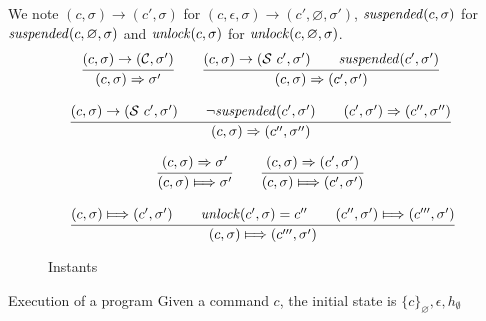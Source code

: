 \documentclass[12pt]{article}
\def\heap{\sigma}
\def\continue{{\mathcal{C}}}
\def\suspend{{\mathcal{S}}}
\begin{document}
We note $(c,\heap) \rightarrow (c', \heap)$ for $(c,\epsilon,\heap) \rightarrow (c',\varnothing,\heap')$,
$\suspended(c,\heap)$ for $\suspended(c,\varnothing,\heap)$ and
$\unlock(c,\heap)$ for $\unlock(c,\varnothing,\heap)$.
$$
\begin{array}{c}
  \cfrac{
   (c,\heap) \rightarrow (\continue,\heap') 
  }{
    (c,\heap) \Rightarrow \heap'
  }
  \qquad
  \cfrac{
    (c,\heap) \rightarrow (\suspend~c',\heap') \qquad 
    \suspended (c',\heap')
   }{
     (c,\heap) \Rightarrow (c', \heap')
   }
  \\\\
  \cfrac{
   (c,\heap) \rightarrow (\suspend~c',\heap') \qquad 
   \neg \suspended (c',\heap') \qquad (c',\heap') \Rightarrow (c'',\heap'')
  }{
    (c,\heap) \Rightarrow (c'', \heap'')
  }
\end{array}
$$
\begin{figure}
$$
\begin{array}{c}
  \cfrac{
    (c,\heap) \Rightarrow \heap'
  }{
    (c,\heap) \Longmapsto \heap'
  }
  \qquad 
  \cfrac{
    (c,\heap) \Rightarrow (c',\heap')
  }{
    (c,\heap) \Longmapsto (c', \heap')
  }
  \\\\\
  \cfrac{
  (c,\heap) \Longmapsto (c', \heap') \qquad \unlock(c',\heap) = c'' \qquad (c'', \heap') \Longmapsto (c''',\heap')
  }{
    (c,\heap) \Longmapsto (c''', \heap')
  }
\end{array}
$$
\label{fig:instants}
\caption{Instants}
\end{figure}
\begin{paragraph}{Execution of a program}
Given a command $c$, the initial state is $\{c\}_\varnothing,\epsilon,h_\emptyset$
\end{paragraph}
\end{document}
